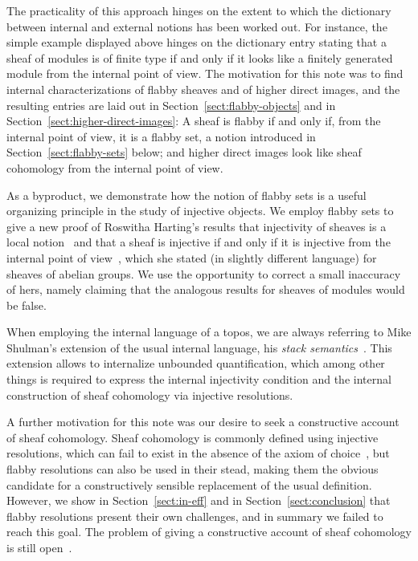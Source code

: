 \documentclass[oneside]{amsart}
\theoremstyle{definition}
\theoremstyle{plain}
\theoremstyle{remark}
\renewcommand{\_}{\mathpunct{.}\,}
\begin{document}
The practicality of this approach hinges on the extent to which the dictionary
between internal and external notions has been worked out. For instance, the
simple example displayed above hinges on the dictionary entry stating that a
sheaf of modules is of finite type if and only if it looks like a
finitely generated module from the internal point of view. The motivation for
this note was to find internal characterizations of flabby sheaves and of higher
direct images, and the resulting entries are laid out in
Section~\ref{sect:flabby-objects} and in
Section~\ref{sect:higher-direct-images}: A sheaf is flabby if and only if, from
the internal point of view, it is a flabby set, a notion introduced in
Section~\ref{sect:flabby-sets} below; and higher direct images look like sheaf
cohomology from the internal point of view.

As a byproduct, we demonstrate how the notion of flabby sets is a useful
organizing principle in the study of injective objects. We employ flabby sets
to give a new proof of Roswitha Harting's results that injectivity of sheaves is
a local notion~\cite{harting:remark} and that a sheaf is injective if and only
if it is injective from the internal point of
view~\cite{harting:locally-injective}, which she stated (in slightly different
language) for sheaves of abelian groups. We use the opportunity to correct a
small inaccuracy of hers, namely claiming that the analogous results for sheaves of
modules would be false.

When employing the internal language of a topos, we are always referring to Mike Shulman's
extension of the usual internal language, his \emph{stack
semantics}~\cite{shulman:stack-semantics}. This extension allows to internalize
unbounded quantification, which among other things is required to express the
internal injectivity condition and the internal construction of sheaf
cohomology via injective resolutions.

A further motivation for this note was our desire to seek a constructive
account of sheaf cohomology. Sheaf cohomology is commonly defined using
injective resolutions, which can fail to exist in the absence of the axiom of
choice~\cite{blass:inj-proj-axc}, but flabby resolutions
can also be used in their stead, making them the obvious candidate for a
constructively sensible replacement of the usual definition. However, we show
in Section~\ref{sect:in-eff} and in Section~\ref{sect:conclusion} that flabby
resolutions present their own challenges, and in summary we failed to reach this
goal. The problem of giving a constructive account
of sheaf cohomology is still open~\cite{tenorio-mariano:cohomology}.
\end{document}
